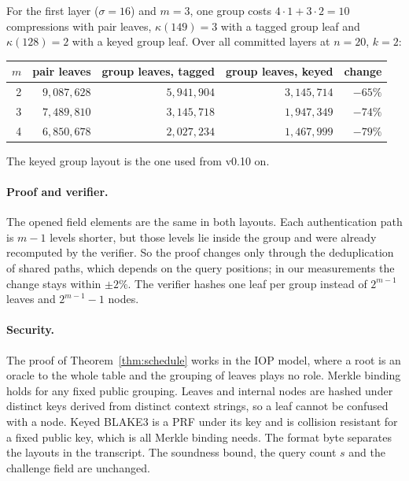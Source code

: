 For the first layer ($\sigma=16$) and $m=3$, one group costs $4\cdot1+3\cdot2=10$ compressions with
pair leaves, $\kappa(149)=3$ with a tagged group leaf and $\kappa(128)=2$ with a keyed group leaf.
Over all committed layers at $n=20$, $k=2$:
\begin{center}
\begin{tabular}{rrrrr}
\toprule
$m$ & pair leaves & group leaves, tagged & group leaves, keyed & change\\
\midrule
2 & $9{,}087{,}628$ & $5{,}941{,}904$ & $3{,}145{,}714$ & $-65\%$\\
3 & $7{,}489{,}810$ & $3{,}145{,}718$ & $1{,}947{,}349$ & $-74\%$\\
4 & $6{,}850{,}678$ & $2{,}027{,}234$ & $1{,}467{,}999$ & $-79\%$\\
\bottomrule
\end{tabular}
\end{center}
The keyed group layout is the one used from v0.10 on.

\paragraph{Proof and verifier.} The opened field elements are the same in both layouts. Each
authentication path is $m-1$ levels shorter, but those levels lie inside the group and were already
recomputed by the verifier. So the proof changes only through the deduplication of shared paths,
which depends on the query positions; in our measurements the change stays within $\pm2\%$. The
verifier hashes one leaf per group instead of $2^{m-1}$ leaves and $2^{m-1}-1$ nodes.

\paragraph{Security.} The proof of Theorem~\ref{thm:schedule} works in the IOP model, where a root is
an oracle to the whole table and the grouping of leaves plays no role. Merkle binding holds for any
fixed public grouping. Leaves and internal nodes are hashed under distinct keys derived from
distinct context strings, so a leaf cannot be confused with a node. Keyed BLAKE3 is a PRF under its
key and is collision resistant for a fixed public key, which is all Merkle binding needs. The format
byte separates the layouts in the transcript. The
soundness bound, the query count $s$ and the challenge field are unchanged.

